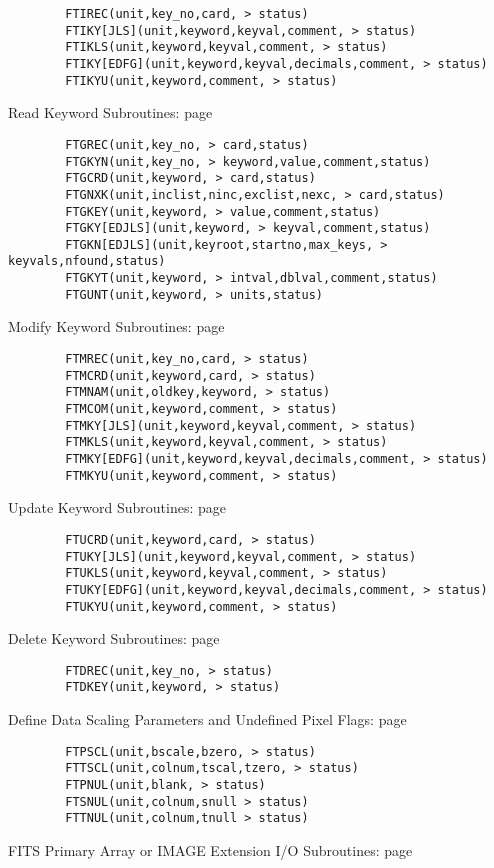 \documentclass[11pt]{book}
\begin{document}
\begin{verbatim}
        FTIREC(unit,key_no,card, > status)
        FTIKY[JLS](unit,keyword,keyval,comment, > status)
        FTIKLS(unit,keyword,keyval,comment, > status)
        FTIKY[EDFG](unit,keyword,keyval,decimals,comment, > status)
        FTIKYU(unit,keyword,comment, > status)
\end{verbatim}
 Read Keyword Subroutines: page~\pageref{FTGREC}

\begin{verbatim}
        FTGREC(unit,key_no, > card,status)
        FTGKYN(unit,key_no, > keyword,value,comment,status)
        FTGCRD(unit,keyword, > card,status)
        FTGNXK(unit,inclist,ninc,exclist,nexc, > card,status)
        FTGKEY(unit,keyword, > value,comment,status)
        FTGKY[EDJLS](unit,keyword, > keyval,comment,status)
        FTGKN[EDJLS](unit,keyroot,startno,max_keys, > keyvals,nfound,status)
        FTGKYT(unit,keyword, > intval,dblval,comment,status)
        FTGUNT(unit,keyword, > units,status)
\end{verbatim}
 Modify Keyword Subroutines: page~\pageref{FTMREC}

\begin{verbatim}
        FTMREC(unit,key_no,card, > status)
        FTMCRD(unit,keyword,card, > status)
        FTMNAM(unit,oldkey,keyword, > status)
        FTMCOM(unit,keyword,comment, > status)
        FTMKY[JLS](unit,keyword,keyval,comment, > status)
        FTMKLS(unit,keyword,keyval,comment, > status)
        FTMKY[EDFG](unit,keyword,keyval,decimals,comment, > status)
        FTMKYU(unit,keyword,comment, > status)
\end{verbatim}
 Update Keyword Subroutines: page~\pageref{FTUCRD}

\begin{verbatim}
        FTUCRD(unit,keyword,card, > status)
        FTUKY[JLS](unit,keyword,keyval,comment, > status)
        FTUKLS(unit,keyword,keyval,comment, > status)
        FTUKY[EDFG](unit,keyword,keyval,decimals,comment, > status)
        FTUKYU(unit,keyword,comment, > status)
\end{verbatim}
 Delete Keyword Subroutines: page~\pageref{FTDREC}

\begin{verbatim}
        FTDREC(unit,key_no, > status)
        FTDKEY(unit,keyword, > status)
\end{verbatim}
 Define Data Scaling Parameters and Undefined Pixel Flags: page~\pageref{FTPSCL}

\begin{verbatim}
        FTPSCL(unit,bscale,bzero, > status)
        FTTSCL(unit,colnum,tscal,tzero, > status)
        FTPNUL(unit,blank, > status)
        FTSNUL(unit,colnum,snull > status)
        FTTNUL(unit,colnum,tnull > status)
\end{verbatim}
 FITS Primary Array or IMAGE Extension I/O Subroutines: page~\pageref{FTPPR}
\end{document}
